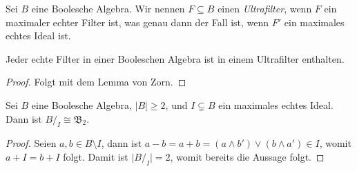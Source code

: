 \begin{definition}
    Sei $B$ eine Boolesche Algebra. Wir nennen $F \subseteq B$ einen \emph{Ultrafilter}, wenn $F$ ein maximaler echter Filter ist, was genau dann der Fall ist, wenn $F'$ ein maximales echtes Ideal ist.
\end{definition}

\begin{theorem}
    Jeder echte Filter in einer Booleschen Algebra ist in einem Ultrafilter enthalten.
\end{theorem}

\begin{proof}
    Folgt mit dem Lemma von Zorn.
\end{proof}

\begin{lemma}
    Sei $B$ eine Boolesche Algebra, $\vert B \vert \geq 2$, und $I \subsetneq B$ ein maximales echtes Ideal. Dann ist $B /_I \cong \mathfrak{B}_2$. 
\end{lemma}

\begin{proof}
    Seien $a, b \in B \setminus I$, dann ist $a - b = a + b = (a \land b') \lor (b \land a') \in I$, womit $a + I = b + I$ folgt. Damit ist $\vert B/_I \vert = 2$, womit bereits die Aussage folgt.
\end{proof}

